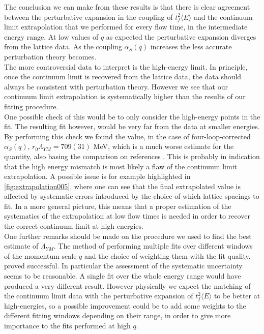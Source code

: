 The conclusion we can make from these results is that there is clear agreement between the perturbative expansion in the coupling of $t_f^2\langle E\rangle$ and the continuum limit extrapolation that we performed for every flow time, in the intermediate energy range. At low values of $q$ as expected  the perturbative expansion diverges from the lattice data. As the coupling $\alpha_S(q)$ increases the less accurate perturbation theory becomes.\\
The more controversial data to interpret is the high-energy limit. In principle, once the continuum limit is recovered from the lattice data, the data should always be consistent with perturbation theory. However we see that our continuum limit extrapolation is systematically higher than the results of our fitting procedure.  \\
One possible check of this would be to only consider the high-energy points in the fit. The resulting fit however, would be very far from the data at smaller energies. By performing this check we found the value, in the case of four-loop-corrected $\alpha_S(q)$, $r_0\Lambda_{YM} = 709(31)$ MeV, which is a much worse estimate for the quantity, also basing the comparison on references \cite{capitani_non-perturbative_1999}. This is probably in indication that the high energy mismatch is most likely a flaw of the continuum limit extrapolation. A possible issue is for example highlighted in \cref{fig:extrapolation005}, where one can see that the final extrapolated value is affected by systematic errors introduced by the choice of which lattice spacings to fit. In a more general picture, this means that a proper estimation of the systematics of the extrapolation at low flow times is needed in order to recover the correct continuum limit at high energies.\\
One further remarks should be made on the procedure we used to find the best estimate of $\Lambda_{YM}$. The method of performing multiple fits over different windows of the momentum scale $q$ and the choice of weighting them with the fit quality, proved successful. In particular the assessment of the systematic uncertainty seems to be reasonable. A single fit over the whole energy range would have produced a very different result. However physically we expect the matching of the continuum limit data with the perturbative expansion of  $t_f^2\langle E\rangle$  to be better at high-energies, so a possible improvement could be to add some weights to the different fitting windows depending on their range, in order to give more importance to the fits performed at high $q$. 
